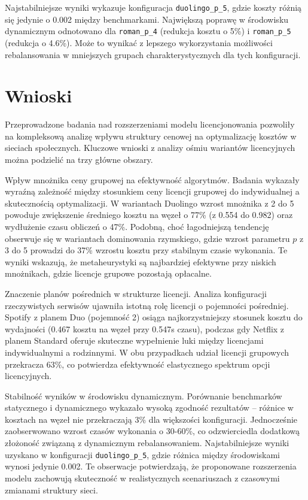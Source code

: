 Najstabilniejsze wyniki wykazuje konfiguracja \texttt{duolingo\_p\_5}, gdzie koszty różnią się jedynie o 0.002 między benchmarkami. Największą poprawę w środowisku dynamicznym odnotowano dla \texttt{roman\_p\_4} (redukcja kosztu o 5\%) i \texttt{roman\_p\_5} (redukcja o 4.6\%). Może to wynikać z lepszego wykorzystania możliwości rebalansowania w mniejszych grupach charakterystycznych dla tych konfiguracji.
\section{Wnioski}

Przeprowadzone badania nad rozszerzeniami modelu licencjonowania pozwoliły na kompleksową analizę wpływu struktury cenowej na optymalizację kosztów w sieciach społecznych. Kluczowe wnioski z analizy ośmiu wariantów licencyjnych można podzielić na trzy główne obszary.

Wpływ mnożnika ceny grupowej na efektywność algorytmów. Badania wykazały wyraźną zależność między stosunkiem ceny licencji grupowej do indywidualnej a skutecznością optymalizacji. W wariantach Duolingo wzrost mnożnika z 2 do 5 powoduje zwiększenie średniego kosztu na węzeł o 77\% (z 0.554 do 0.982) oraz wydłużenie czasu obliczeń o 47\%. Podobną, choć łagodniejszą tendencję obserwuje się w wariantach dominowania rzymskiego, gdzie wzrost parametru $p$ z 3 do 5 prowadzi do 37\% wzrostu kosztu przy stabilnym czasie wykonania. Te wyniki wskazują, że metaheurystyki są najbardziej efektywne przy niskich mnożnikach, gdzie licencje grupowe pozostają opłacalne.

Znaczenie planów pośrednich w strukturze licencji. Analiza konfiguracji rzeczywistych serwisów ujawniła istotną rolę licencji o pojemności pośredniej. Spotify z planem Duo (pojemność 2) osiąga najkorzystniejszy stosunek kosztu do wydajności (0.467 kosztu na węzeł przy 0.547s czasu), podczas gdy Netflix z planem Standard oferuje skuteczne wypełnienie luki między licencjami indywidualnymi a rodzinnymi. W obu przypadkach udział licencji grupowych przekracza 63\%, co potwierdza efektywność elastycznego spektrum opcji licencyjnych.

Stabilność wyników w środowisku dynamicznym. Porównanie benchmarków statycznego i dynamicznego wykazało wysoką zgodność rezultatów -- różnice w kosztach na węzeł nie przekraczają 3\% dla większości konfiguracji. Jednocześnie zaobserwowano wzrost czasów wykonania o 30-60\%, co odzwierciedla dodatkową złożoność związaną z dynamicznym rebalansowaniem. Najstabilniejsze wyniki uzyskano w konfiguracji \texttt{duolingo\_p\_5}, gdzie różnica między środowiskami wynosi jedynie 0.002. Te obserwacje potwierdzają, że proponowane rozszerzenia modelu zachowują skuteczność w realistycznych scenariuszach z czasowymi zmianami struktury sieci.

